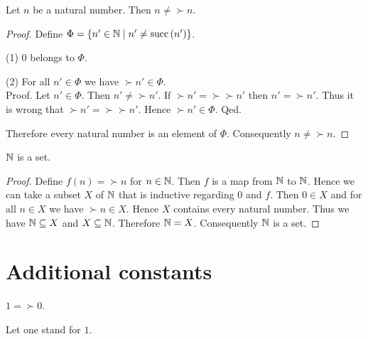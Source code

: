 \documentclass[../arithmetic.tex]{subfiles}
\begin{document}
  \begin{forthel}
    \begin{proposition}
      Let $n$ be a natural number.
      Then $n \neq \succ{n}$.
    \end{proposition}
    \begin{proof}
      Define $\Phi = \{ n' \in \mathbb{N} \mid n' \neq \mathrm{succ}\left(n'\right) \}$.

      (1) $0$ belongs to $\Phi$.

      (2) For all $n' \in \Phi$ we have $\succ{n'} \in \Phi$. \\
      Proof.
        Let $n' \in \Phi$.
        Then $n' \neq \succ{n'}$.
        If $\succ{n'} = \succ{\succ{n'}}$ then $n' = \succ{n'}$.
        Thus it is wrong that $\succ{n'} = \succ{\succ{n'}}$.
        Hence $\succ{n'} \in \Phi$.
      Qed.

      Therefore every natural number is an element of $\Phi$.
      Consequently $n \neq \succ{n}$.
    \end{proof}
  \end{forthel}

  \begin{forthel}
    \begin{proposition}
      $\mathbb{N}$ is a set.
    \end{proposition}
    \begin{proof}
      Define $f(n) = \succ{n}$ for $n \in \mathbb{N}$.
      Then $f$ is a map from $\mathbb{N}$ to $\mathbb{N}$.
      Hence we can take a subset $X$ of $\mathbb{N}$ that is inductive regarding
      $0$ and $f$.
      Then $0 \in X$ and for all $n \in X$ we have $\succ{n} \in X$.
      Hence $X$ contains every natural number.
      Thus we have $\mathbb{N} \subseteq X$ and $X \subseteq \mathbb{N}$.
      Therefore $\mathbb{N} = X$.
      Consequently $\mathbb{N}$ is a set.
    \end{proof}
  \end{forthel}


  \section{Additional constants}

  \begin{forthel}
    \begin{definition}
      $1 = \succ{0}$.
    \end{definition}

    Let one stand for $1$.
  \end{forthel}
\end{document}
